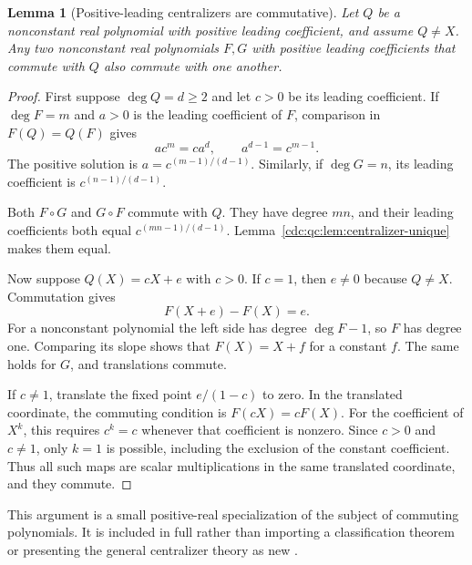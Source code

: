 \documentclass[11pt,a4paper]{article}
\newtheorem{lemma}[lemma]{Lemma}
\theoremstyle{definition}
\theoremstyle{remark}
\begin{document}
\begin{lemma}[Positive-leading centralizers are commutative]\label{cdc:qc:lem:positive-centralizer}
Let $Q$ be a nonconstant real polynomial with positive leading coefficient, and assume $Q\ne X$. Any two nonconstant real polynomials $F,G$ with positive leading coefficients that commute with $Q$ also commute with one another.
\end{lemma}
\begin{proof}
First suppose $\deg Q=d\geq2$ and let $c>0$ be its leading coefficient. If $\deg F=m$ and $a>0$ is the leading coefficient of $F$, comparison in $F(Q)=Q(F)$ gives
\[
 ac^m=ca^d,\qquad a^{d-1}=c^{m-1}.
\]
The positive solution is $a=c^{(m-1)/(d-1)}$. Similarly, if $\deg G=n$, its leading coefficient is $c^{(n-1)/(d-1)}$.

Both $F\circ G$ and $G\circ F$ commute with $Q$. They have degree $mn$, and their leading coefficients both equal $c^{(mn-1)/(d-1)}$. Lemma~\ref{cdc:qc:lem:centralizer-unique} makes them equal.

Now suppose $Q(X)=cX+e$ with $c>0$. If $c=1$, then $e\ne0$ because $Q\ne X$. Commutation gives
\[
 F(X+e)-F(X)=e.
\]
For a nonconstant polynomial the left side has degree $\deg F-1$, so $F$ has degree one. Comparing its slope shows that $F(X)=X+f$ for a constant $f$. The same holds for $G$, and translations commute.

If $c\ne1$, translate the fixed point $e/(1-c)$ to zero. In the translated coordinate, the commuting condition is $F(cX)=cF(X)$. For the coefficient of $X^k$, this requires $c^k=c$ whenever that coefficient is nonzero. Since $c>0$ and $c\ne1$, only $k=1$ is possible, including the exclusion of the constant coefficient. Thus all such maps are scalar multiplications in the same translated coordinate, and they commute.
\end{proof}

This argument is a small positive-real specialization of the subject of commuting polynomials. It is included in full rather than importing a classification theorem or presenting the general centralizer theory as new \cite{atela-hu}.
\end{document}
